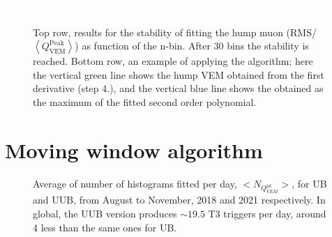 \documentclass[twoside, final, 10pt]{articleMine}
\begin{document}
\textcolor{white}{hi}
\begin{figure}[!t]
  \centering
  \caption{Top row, results for the stability of fitting the hump
  muon (RMS/$\left<Q^\mathrm{Peak}_\mathrm{VEM}\right>$) as
  function of the n-bin. After 30 bins the stability is reached.
  Bottom row, an example of applying the algorithm; here the
  vertical green line shows the hump VEM obtained from the first
  derivative (step 4.), and the vertical blue line shows the
  \qpkvem obtained as the maximum of the fitted second order
  polynomial.}
  \label{figApplyingAlgorithm}
\end{figure}
\newpage

\section{Moving window algorithm}
\label{secMovingWindowAlgo}
\begin{figure}[!t]
  \centering
  \caption{Average of number of histograms fitted per day,
  $< N_{Q^{pk}_{VEM}}>$, for UB and UUB, from August
  to November, 2018 and 2021 respectively. In global, the UUB
  version produces $\sim19.5$ T3 triggers per day, around 4 less
  than the same ones for UB.}
  \label{figDistDiffAveQpkDayPmts}
\end{figure}
\end{document}
